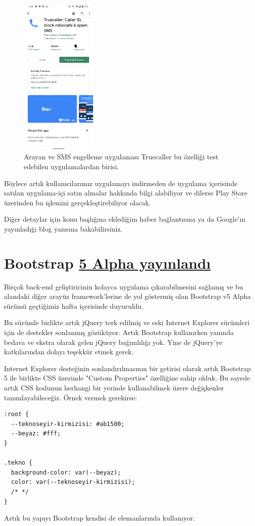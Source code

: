 \documentclass[11pt]{article}
\begin{document}
\begin{figure}[htbp]
\centering
\includegraphics[height=7.8cm]{gorseller/google-play-install.png}
\caption{Arayan ve SMS engelleme uygulaması Truecaller bu özelliği test edebilen uygulamalardan birisi.}
\end{figure}

Böylece artık kullanıcılarımız uygulamayı indirmeden de uygulama içerisinde
satılan uygulama-içi satın almalar hakkında bilgi alabiliyor ve dilerse Play
Store üzerinden bu işlemini gerçekleştirebiliyor olacak.

Diğer detaylar için konu başlığına eklediğim haber bağlantısına ya da
Google'ın yayınladığı blog yazısına bakabilirsiniz.
\section{Bootstrap \href{https://blog.getbootstrap.com/2020/06/16/bootstrap-5-alpha/}{5 Alpha yayınlandı}}
\label{sec:org4ba5b16}
Birçok back-end geliştiricinin kolayca uygulama çıkarabilmesini sağlamış ve bu
alandaki diğer arayüz framework'lerine de yol göstermiş olan Bootstrap v5
Alpha sürümü geçtiğimiz hafta içerisinde duyuruldu.

Bu sürümle birlikte artık jQuery terk edilmiş ve eski Internet Explorer
sürümleri için de destekler sonlanmış gözüküyor. Artık Bootstrap kullanırken
yanında bedava ve ekstra olarak gelen jQuery bağımlılığı yok. Yine de
jQuery'ye katkılarından dolayı teşekkür etmek gerek.

Internet Explorer desteğinin sonlandırılmasının bir getirisi olarak artık
Bootstrap 5 ile birlikte CSS üzerinde "Custom Properties" özelliğine sahip
olduk. Bu sayede artık CSS kodunun herhangi bir yerinde kullanabilmek üzere
değişkenler tanımlayabileceğiz. Örnek vermek gerekirse:
\begin{verbatim}
:root {
  --teknoseyir-kirmizisi: #ab1500;
  --beyaz: #fff;
}

.tekno {
  background-color: var(--beyaz);
  color: var(--teknoseyir-kirmizisi);
  /* */
}
\end{verbatim}
Artık bu yapıyı Bootstrap kendisi de elemanlarında kullanıyor.
\end{document}
